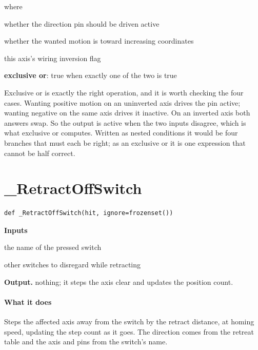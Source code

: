 \noindent where
\begin{description}[leftmargin=2.4em,style=nextline,font=\normalfont\ttfamily]\setlength\itemsep{1pt}
  \item[{$\mathrm{forward}$}] \normalfont whether the direction pin should be driven active
  \item[{$\mathrm{positive}$}] \normalfont whether the wanted motion is toward increasing coordinates
  \item[{$\mathrm{invert}$}] \normalfont this axis's wiring inversion flag
  \item[{$\oplus$}] \normalfont \textbf{exclusive or}: true when exactly one of the two is true
\end{description}
Exclusive or is exactly the right operation, and it is worth checking the four cases. Wanting positive motion on an uninverted axis drives the pin active; wanting negative on the same axis drives it inactive. On an inverted axis both answers swap. So the output is active when the two inputs disagree, which is what exclusive or computes. Written as nested conditions it would be four branches that must each be right; as an exclusive or it is one expression that cannot be half correct.


\section{\_RetractOffSwitch}
\begin{lstlisting}[style=sig]
def _RetractOffSwitch(hit, ignore=frozenset())
\end{lstlisting}

\noindent\textbf{Inputs}
\begin{description}[leftmargin=2.2em,style=nextline,font=\normalfont\ttfamily]\setlength\itemsep{1pt}
  \item[{hit}] \normalfont the name of the pressed switch
  \item[{ignore}] \normalfont other switches to disregard while retracting
\end{description}

\noindent\textbf{Output.} nothing; it steps the axis clear and updates the position count.


\paragraph{What it does}
Steps the affected axis away from the switch by the retract distance, at homing speed, updating the step count as it goes. The direction comes from the retreat table and the axis and pins from the switch's name.



